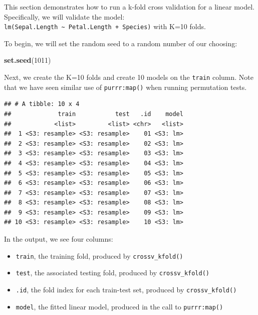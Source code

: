\documentclass[]{article}
\newenvironment{Shaded}{\begin{snugshade}}{\end{snugshade}}
\newcommand{\KeywordTok}[1]{\textcolor[rgb]{0.13,0.29,0.53}{\textbf{#1}}}
\newcommand{\DataTypeTok}[1]{\textcolor[rgb]{0.13,0.29,0.53}{#1}}
\newcommand{\DecValTok}[1]{\textcolor[rgb]{0.00,0.00,0.81}{#1}}
\newcommand{\StringTok}[1]{\textcolor[rgb]{0.31,0.60,0.02}{#1}}
\newcommand{\OperatorTok}[1]{\textcolor[rgb]{0.81,0.36,0.00}{\textbf{#1}}}
\newcommand{\NormalTok}[1]{#1}
\providecommand{\tightlist}{%
  \setlength{\itemsep}{0pt}\setlength{\parskip}{0pt}}
\begin{document}
This section demonstrates how to run a k-fold cross validation for a
linear model. Specifically, we will validate the model:
\texttt{lm(Sepal.Length\ \textasciitilde{}\ Petal.Length\ +\ Species)}
with K=10 folds.

To begin, we will set the random seed to a random number of our
choosing:

\begin{Shaded}
\begin{Highlighting}[]
\KeywordTok{set.seed}\NormalTok{(}\DecValTok{1011}\NormalTok{)}
\end{Highlighting}
\end{Shaded}

Next, we create the K=10 folds and create 10 models on the
\texttt{train} column. Note that we have seen similar use of
\texttt{purrr:map()} when running permutation tests.

\begin{Shaded}
\end{Shaded}

\begin{verbatim}
## # A tibble: 10 x 4
##             train           test   .id    model
##            <list>         <list> <chr>   <list>
##  1 <S3: resample> <S3: resample>    01 <S3: lm>
##  2 <S3: resample> <S3: resample>    02 <S3: lm>
##  3 <S3: resample> <S3: resample>    03 <S3: lm>
##  4 <S3: resample> <S3: resample>    04 <S3: lm>
##  5 <S3: resample> <S3: resample>    05 <S3: lm>
##  6 <S3: resample> <S3: resample>    06 <S3: lm>
##  7 <S3: resample> <S3: resample>    07 <S3: lm>
##  8 <S3: resample> <S3: resample>    08 <S3: lm>
##  9 <S3: resample> <S3: resample>    09 <S3: lm>
## 10 <S3: resample> <S3: resample>    10 <S3: lm>
\end{verbatim}

In the output, we see four columns:

\begin{itemize}
\tightlist
\item
  \texttt{train}, the training fold, produced by
  \texttt{crossv\_kfold()}
\item
  \texttt{test}, the associated testing fold, produced by
  \texttt{crossv\_kfold()}
\item
  \texttt{.id}, the fold index for each train-test set, produced by
  \texttt{crossv\_kfold()}
\item
  \texttt{model}, the fitted linear model, produced in the call to
  \texttt{purrr:map()}
\end{itemize}
\end{document}
